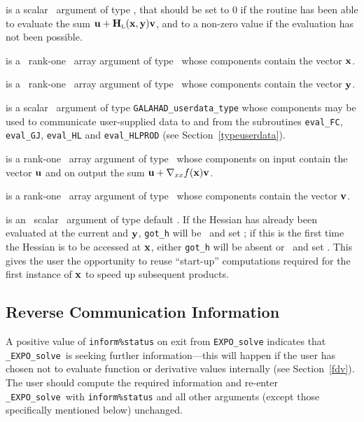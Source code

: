 \documentclass{galahad}
\newcommand{\packagename}{EXPO}
\newcommand{\fullpackagename}{\libraryname\_\packagename}
\newcommand{\solver}{{\tt \fullpackagename\_solve}}
\newcommand{\bmHL}{\bmH\sub{L}}
\begin{document}
\begin{description}
 is a scalar \intentout\ argument of type \integer,
that should be set to 0 if the routine has been able to evaluate the
sum $\bmu + \bmHL(\bmx,\bmy) \bmv$,
and to a non-zero value if the evaluation has not been possible.

 is a \ rank-one \intentin\ array argument of type
\realdp\ whose components contain the vector ${\mathbf{x}}$.

 is a \ rank-one \intentin\ array argument of type
\realdp\ whose components contain the vector ${\mathbf{y}}$.

 is a scalar \intentinout\ argument of type
{\tt GALAHAD\_userdata\_type} whose components may be used
to communicate user-supplied data to and from the
subroutines {\tt eval\_FC}, {\tt eval\_GJ},
{\tt eval\_HL} and {\tt eval\_HLPROD}
(see Section~\ref{typeuserdata}).

 is a rank-one \intentinout\ array argument of type \realdp\
whose components on input contain the vector ${\mathbf{u}}$ and on output the
sum ${\mathbf{u}} + \nabla_{xx} f({\mathbf{x}}) {\mathbf{v}}$.

 is a rank-one \intentin\ array argument of type \realdp\
whose components contain the vector ${\mathbf{v}}$.

 is an \optional\ scalar \intentin\ argument of type default
\logical. If the Hessian has already been evaluated at the current 
and ${\mathbf{y}}$, {\tt got\_h} will be \present\ and set \true; if this is the 
first time the Hessian is to be accessed at ${\mathbf{x}}$, either {\tt got\_h} 
will be absent
or \present\ and set \false. This gives the user the opportunity
to reuse ``start-up'' computations required for the first instance of
${\mathbf{x}}$ to speed up subsequent products.

\end{description}



\subsection{\label{reverse}Reverse Communication Information}

A positive value of {\tt inform\%status} on exit from
{\tt \packagename\_solve}
indicates that
\solver\ is seeking further information---this will happen
if the user has chosen not to evaluate function or
derivative values internally (see Section~\ref{fdv}).
The user should compute the required information and re-enter \solver\
with {\tt inform\%status} and all other arguments (except those specifically
mentioned below) unchanged.
\end{document}

